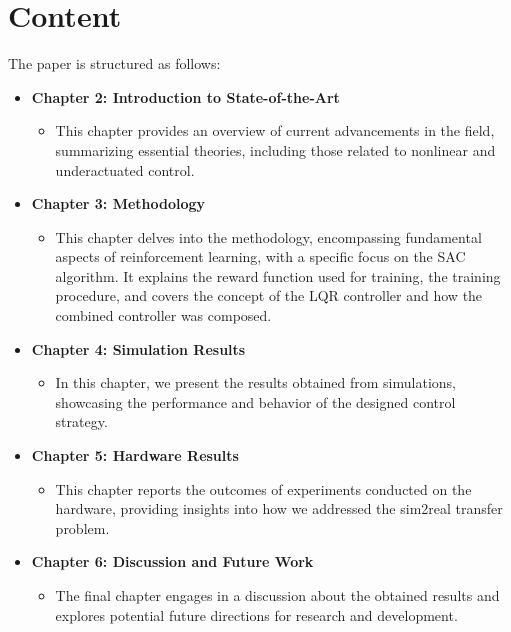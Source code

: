 \section{Content}
The paper is structured as follows:

\begin{itemize}
  \item \textbf{Chapter 2: Introduction to State-of-the-Art}
  \begin{itemize}
    \item This chapter provides an overview of current advancements in the field, summarizing essential theories, including those related to nonlinear and underactuated control.
  \end{itemize}
  
  \item \textbf{Chapter 3: Methodology}
  \begin{itemize}
    \item This chapter delves into the methodology, encompassing fundamental aspects of reinforcement learning, with a specific focus on the SAC algorithm. It explains the reward function used for training, the training procedure, and covers the concept of the LQR controller and how the combined controller was composed.
  \end{itemize}
  
  \item \textbf{Chapter 4: Simulation Results}
  \begin{itemize}
    \item In this chapter, we present the results obtained from simulations, showcasing the performance and behavior of the designed control strategy.
  \end{itemize}
  
  \item \textbf{Chapter 5: Hardware Results}
  \begin{itemize}
    \item This chapter reports the outcomes of experiments conducted on the hardware, providing insights into how we addressed the sim2real transfer problem.
  \end{itemize}
  
  \item \textbf{Chapter 6: Discussion and Future Work}
  \begin{itemize}
    \item The final chapter engages in a discussion about the obtained results and explores potential future directions for research and development.
  \end{itemize}
\end{itemize}

\cleardoublepage
